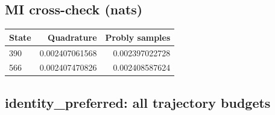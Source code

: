 \reservetable
\subsection{MI cross-check (nats)}

\begingroup\small
\setlength{\tabcolsep}{4pt}
\begin{longtable}{lrr}
\toprule

State & Quadrature & Probly samples\\\midrule\endhead

390 & 0.002407061568 & 0.002397022728\\

566 & 0.002407470826 & 0.002408587624\\

\bottomrule
\end{longtable}
\endgroup

\reservetable
\subsection{identity\_preferred: all trajectory budgets}

